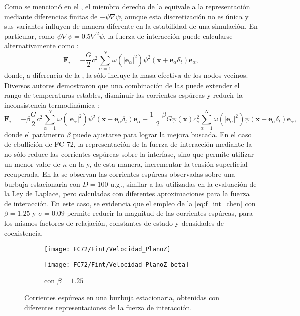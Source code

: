 Como se mencion\'o en el , el miembro derecho de la  equivale a la representaci\'on mediante diferencias finitas de $-\psi \nabla \psi$, aunque esta discretizaci\'on no es \'unica y sus variantes influyen de manera diferente en la estabilidad de una simulaci\'on. En particular, como $\psi \nabla \psi = 0.5 \nabla^2 \psi$, la fuerza de interacci\'on puede calcularse alternativamente como \cite{chen_critical_2014}:
\begin{equation}
	\bm{F}_i = -\dfrac{G}{2} c^2 \sum_{\alpha=1}^N \omega(|\bm{e}_{\alpha}|^2)\psi^2(\bm{x}+\bm{e}_{\alpha}\delta_t)\bm{e}_{\alpha},
	\label{eq:f_int_chen_0}
\end{equation}
donde, a diferencia de la , la  s\'olo incluye la masa efectiva de los nodos vecinos. Diversos autores demostraron que una combinaci\'on de las  puede extender el rango de temperaturas estables, disminuir las corrientes esp\'ureas y reducir la inconsistencia termodin\'amica \cite{kupershtokh_equations_2009, gong_numerical_2012}:
\begin{equation}
	\bm{F}_i = -\beta\dfrac{G}{2} c^2 \sum_{\alpha=1}^N \omega(|\bm{e}_{\alpha}|^2)\psi^2(\bm{x}+\bm{e}_{\alpha}\delta_t)\bm{e}_{\alpha}
	-\dfrac{1-\beta}{2} G\psi(\bm{x})c_s^2 \sum_{\alpha=1}^N \omega(|\bm{e}_{\alpha}|^2)\psi(\bm{x}+\bm{e}_{\alpha}\delta_t)\bm{e}_{\alpha},
	\label{eq:f_int_chen}
\end{equation}
donde el par\'ametro $\beta$ puede ajustarse para lograr la mejora buscada. En el caso de ebullici\'on de FC-72, la representaci\'on de la fuerza de interacci\'on mediante la  no s\'olo reduce las corrientes esp\'ureas sobre la interfase, sino que permite utilizar un menor valor de $\kappa$ en la  y, de esta manera, incrementar la tensi\'on superficial recuperada. En la  se observan las corrientes esp\'ureas observadas sobre una burbuja estacionaria con $D=100$ u.g., similar a las utilizadas en la evaluaci\'on de la Ley de Laplace, pero calculadas con diferentes aproximaciones para la fuerza de interacci\'on. En este caso, se evidencia que el empleo de la \eqref{eq:f_int_chen} con $\beta=1.25$ y $\sigma=0.09$ permite reducir la magnitud de las corrientes esp\'ureas, para los mismos factores de relajaci\'on, constantes de estado y densidades de coexistencia.

\begin{figure}[htb]
    \centering
    \begin{subfigure}[t]{0.45\textwidth}
        \centering
        \texttt{[image: FC72/Fint/Velocidad\_PlanoZ]}
        \caption{}
    \end{subfigure}
    \begin{subfigure}[t]{0.45\textwidth}
        \centering
        \texttt{[image: FC72/Fint/Velocidad\_PlanoZ\_beta]}
        \caption{ con $\beta=1.25$}
    \end{subfigure}    
    \caption{Corrientes esp\'ureas en una burbuja estacionaria, obtenidas con diferentes representaciones de la fuerza de interacci\'on.}
    \label{fig:fuerza_int}
\end{figure}

